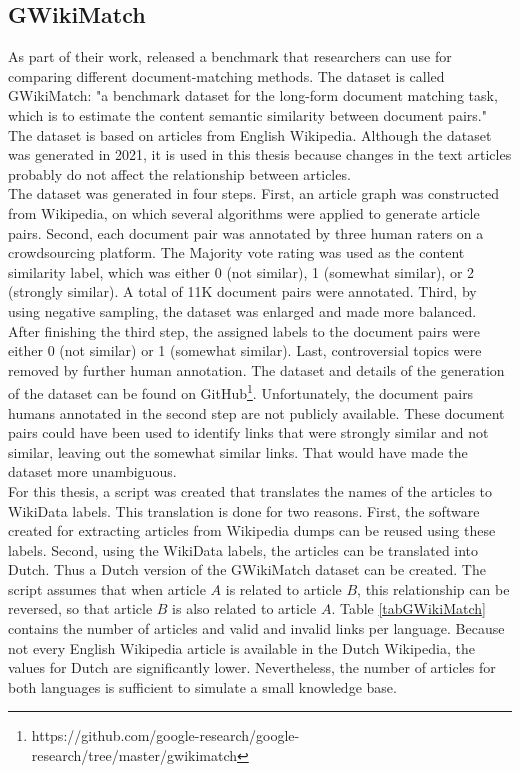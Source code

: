 \subsection{GWikiMatch}
\label{sectWikidata}
As part of their work, \citet{512Tokens} released a benchmark that researchers can use for comparing different document-matching methods. The dataset is called GWikiMatch: "a benchmark dataset for the long-form document matching task, which is to estimate the content semantic similarity between document pairs." The dataset is based on articles from English Wikipedia. Although the dataset was generated in 2021, it is used in this thesis because changes in the text articles probably do not affect the relationship between articles.\\

The dataset was generated in four steps. First, an article graph was constructed from Wikipedia, on which several algorithms were applied to generate article pairs. Second, each document pair was annotated by three human raters on a crowdsourcing platform. The Majority vote rating was used as the content similarity label, which was either 0 (not similar), 1 (somewhat similar), or 2 (strongly similar). A total of 11K document pairs were annotated. Third, by using negative sampling, the dataset was enlarged and made more balanced. After finishing the third step, the assigned labels to the document pairs were either 0 (not similar) or 1 (somewhat similar). Last, controversial topics were removed by further human annotation. The dataset and details of the generation of the dataset can be found on GitHub\footnote{https://github.com/google-research/google-research/tree/master/gwikimatch}. Unfortunately, the document pairs humans annotated in the second step are not publicly available. These document pairs could have been used to identify links that were strongly similar and not similar, leaving out the somewhat similar links. That would have made the dataset more unambiguous.  \\

For this thesis, a script was created that translates the names of the articles to WikiData labels. This translation is done for two reasons. First, the software created for extracting articles from Wikipedia dumps can be reused using these labels. Second, using the WikiData labels, the articles can be translated into Dutch. Thus a Dutch version of the GWikiMatch dataset can be created. The script assumes that when article $A$ is related to article $B$, this relationship can be reversed, so that article $B$ is also related to article $A$. Table \ref{tabGWikiMatch} contains the number of articles and valid and invalid links per language. Because not every English Wikipedia article is available in the Dutch Wikipedia, the values for Dutch are significantly lower. Nevertheless, the number of articles for both languages is sufficient to simulate a small knowledge base.




